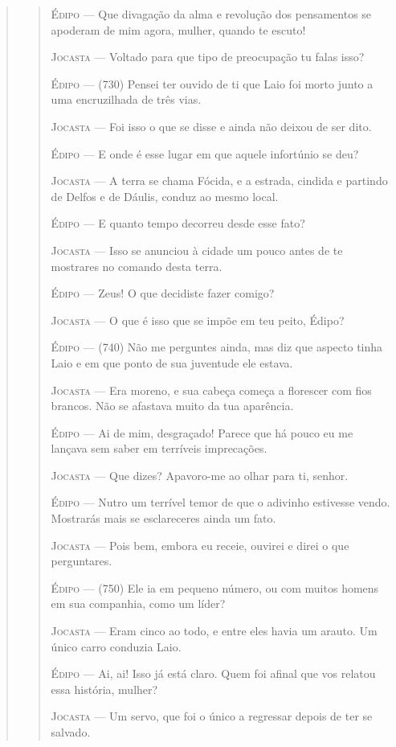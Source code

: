 \begin{verse}
\begin{verse}
\textsc{Édipo} --- Que divagação da alma e revolução dos pensamentos se apoderam de mim
agora, mulher, quando te escuto!

\textsc{Jocasta} --- Voltado para que tipo de preocupação tu falas isso?

\textsc{Édipo} --- (730) Pensei ter ouvido de ti que Laio foi morto junto a uma
encruzilhada de três vias.

\textsc{Jocasta} --- Foi isso o que se disse e ainda não deixou de ser dito.

\textsc{Édipo} --- E onde é esse lugar em que aquele infortúnio se deu?

\textsc{Jocasta} --- A terra se chama Fócida, e a estrada, cindida e partindo de Delfos e de
Dáulis, conduz ao mesmo local.

\textsc{Édipo} --- E quanto tempo decorreu desde esse fato?

\textsc{Jocasta} --- Isso se anunciou à cidade um pouco antes de te mostrares no comando
desta terra.

\textsc{Édipo} --- Zeus! O que decidiste fazer comigo?

\textsc{Jocasta} --- O que é isso que se impõe em teu peito, Édipo?

\textsc{Édipo} --- (740) Não me perguntes ainda, mas diz que aspecto tinha Laio e em que
ponto de sua juventude ele estava.

\textsc{Jocasta} --- Era moreno, e sua cabeça começa a florescer com fios brancos. Não se
afastava muito da tua aparência.

\textsc{Édipo} --- Ai de mim, desgraçado! Parece que há pouco eu me lançava sem saber em
terríveis imprecações.

\textsc{Jocasta} --- Que dizes? Apavoro-me ao olhar para ti, senhor.

\textsc{Édipo} --- Nutro um terrível temor de que o adivinho estivesse vendo. Mostrarás
mais se esclareceres ainda um fato.

\textsc{Jocasta} --- Pois bem, embora eu receie, ouvirei e direi o que perguntares.

\textsc{Édipo} --- (750) Ele ia em pequeno número, ou com muitos homens em sua companhia,
como um líder?

\textsc{Jocasta} --- Eram cinco ao todo, e entre eles havia um arauto. Um único carro
conduzia Laio.

\textsc{Édipo} --- Ai, ai! Isso já está claro. Quem foi afinal que vos relatou essa
história, mulher?

\textsc{Jocasta} --- Um servo, que foi o único a regressar depois de ter se salvado.


\end{verse}
\end{verse}
